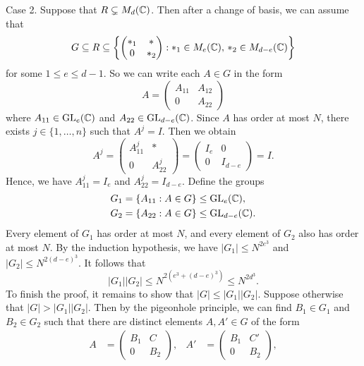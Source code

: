 \begin{pf}
   {\sc Case 2.} Suppose that $R \subsetneq M_d(\mathbb{C})$. Then after a change of 
   basis, we can assume that 
   \[ G \subseteq R \subseteq \left\{ \begin{pmatrix} *_1 & * \\ 0 & *_2 \end{pmatrix} :
    *_1 \in M_e(\mathbb{C}),\, *_2 \in M_{d-e}(\mathbb{C}) \right\} \] 
   for some $1 \leq e \leq d-1$. So we can write each $A \in G$ in the form 
   \[ A = \begin{pmatrix}
       A_{11} & A_{12} \\ 0 & A_{22} 
   \end{pmatrix} \] 
   where $A_{11} \in \operatorname{GL}_e(\mathbb{C})$ and $A_{22} \in \operatorname{GL}_{d-e}(\mathbb{C})$. Since $A$ has 
   order at most $N$, there exists $j \in \{1, \dots, n\}$ such that $A^j = I$. 
   Then we obtain 
   \[ A^j = \begin{pmatrix}
       A_{11}^j & * \\ 0 & A_{22}^j 
   \end{pmatrix} = \begin{pmatrix}
       I_e & 0 \\ 0 & I_{d-e}
   \end{pmatrix} = I. \] 
   Hence, we have $A_{11}^j = I_e$ and $A_{22}^j = I_{d-e}$. Define the groups 
   \begin{align*}
       G_1 &= \{A_{11} : A \in G\} \leq \operatorname{GL}_e(\mathbb{C}), \\ 
       G_2 &= \{A_{22} : A \in G\} \leq \operatorname{GL}_{d-e}(\mathbb{C}). 
   \end{align*}
   Every element of $G_1$ has order at most $N$, and every element of $G_2$
   also has order at most $N$. By the induction hypothesis, we have 
   $|G_1| \leq N^{2e^3}$ and $|G_2| \leq N^{2(d-e)^3}$. It follows that 
   \[ |G_1||G_2| \leq N^{2(e^3+(d-e)^3)} \leq N^{2d^3}. \] 
   To finish the proof, it remains to show that $|G| \leq |G_1||G_2|$.  
   Suppose otherwise that $|G| > |G_1||G_2|$. Then by the pigeonhole 
   principle, we can find $B_1 \in G_1$ and $B_2 \in G_2$ such that 
   there are distinct elements $A, A' \in G$ of the form 
   \begin{align*}
       A &= \begin{pmatrix}
           B_1 & C \\ 0 & B_2
       \end{pmatrix}, & 
       A' &= \begin{pmatrix}
           B_1 & C' \\ 0 & B_2
       \end{pmatrix},
   \end{align*}

\end{pf}
